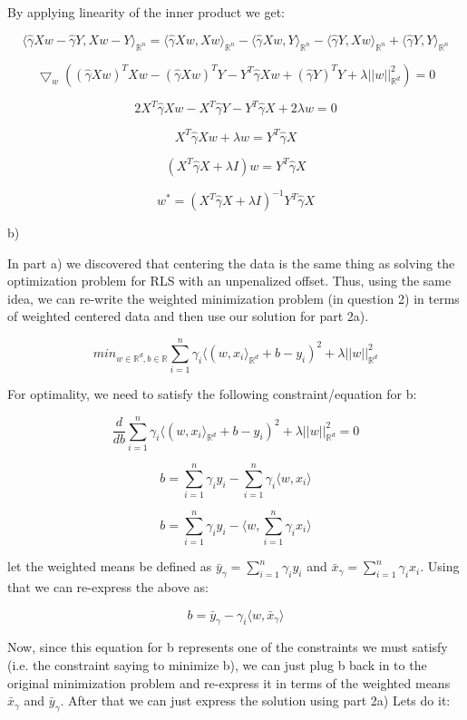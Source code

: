 \documentclass[12pt]{report}
\begin{document}
By applying linearity of the inner product we get:

$$\langle \hat{\gamma} Xw - \hat{\gamma} Y , Xw - Y \rangle_{\mathbb{R}^n}   = \langle \hat{\gamma} Xw, Xw \rangle_{\mathbb{R}^n} - \langle \hat{\gamma} Xw, Y \rangle_{\mathbb{R}^n}  -\langle  \hat{\gamma} Y, Xw \rangle_{\mathbb{R}^n} + \langle \hat{\gamma} Y, Y  \rangle_{\mathbb{R}^n} $$

$$  \bigtriangledown_w ( (\hat{\gamma} Xw)^T Xw -  (\hat{\gamma} Xw)^T Y  - Y^T  \hat{\gamma}  Xw + ( \hat{\gamma} Y)^T Y + \lambda ||w||_{\mathbb{R}^d} ^2)  = 0$$

$$ 2 X^T \hat{\gamma} Xw -  X^T \hat{\gamma} Y  -Y^T  \hat{\gamma}  X  + 2 \lambda w = 0 $$

$$ X^T \hat{\gamma} Xw + \lambda w = Y^T  \hat{\gamma}  X $$

$$ (X^T \hat{\gamma} X + \lambda I)w = Y^T  \hat{\gamma}  X $$

$$ w^* = (X^T \hat{\gamma} X + \lambda I)^{-1}Y^T  \hat{\gamma}  X $$

b)

In part a) we discovered that centering the data is the same thing as solving the optimization problem for RLS with an unpenalized offset.
Thus, using the same idea, we can re-write the weighted minimization problem (in question 2) in terms of weighted centered data and then use our solution for part 2a).

$$min_{w \in \mathbb{R}^d, b \in \mathbb{R}} \sum_{i=1}^{n}\gamma_i \langle ( w, x_i\rangle_{\mathbb{R}^d} +b - y_i)^2 + \lambda ||w||_{\mathbb{R}^d}^2$$

For optimality, we need to satisfy the following constraint/equation for b:

$$\frac{d}{db}\sum_{i=1}^{n}\gamma_i \langle ( w, x_i\rangle_{\mathbb{R}^d} +b - y_i)^2 + \lambda ||w||_{\mathbb{R}^d}^2 = 0$$

$$b = \sum^{n}_{i=1} \gamma_i y_i- \sum^{n}_{i=1} \gamma_i \langle w, x_i\rangle $$

$$b = \sum^{n}_{i=1} \gamma_i y_i-  \langle w, \sum^{n}_{i=1} \gamma_i  x_i\rangle $$

let the weighted means be defined as $\bar{y}_{\gamma} = \sum^{n}_{i=1} \gamma_i y_i$ and $\bar{x}_{\gamma} = \sum^{n}_{i=1} \gamma_i x_i$. Using that we can re-express the above as:

$$b = \bar{y}_{\gamma}- \gamma_i \langle w, \bar{x}_{\gamma}\rangle $$

Now, since this equation for b represents one of the constraints we must satisfy (i.e. the constraint saying to minimize b), we can just plug b back in to the original minimization problem and re-express it in terms of the weighted means $\bar{x}_{\gamma}$ and $\bar{y}_{\gamma}$. After that we can just express the solution using part 2a) Lets do it:
\end{document}
